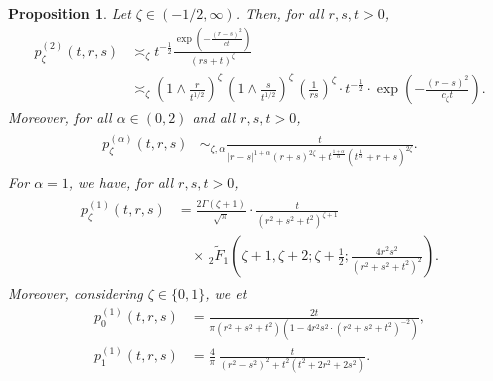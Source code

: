 \documentclass[12pt,reqno]{amsart}
\newtheorem{proposition}[theorem]{Proposition}
\theoremstyle{definition}
\theoremstyle{remark}
\numberwithin{equation}{section}
\newcommand{\1}{\mathbbm{1}}
\begin{document}
\begin{proposition}
  \label{heatkernelalpha1subordinatedboundsfinal}
  Let $\zeta\in(-1/2,\infty)$. Then, for all $r,s,t>0$,
  \begin{subequations}
    \label{eq:easybounds2}
    \begin{align}
      p_\zeta^{(2)}(t,r,s)
      \label{eq:easybounds2a}
      & \asymp_\zeta t^{-\frac12}\frac{\exp\left(-\frac{(r-s)^2}{ct}\right)}{(rs+t)^{\zeta}} \\
      \label{eq:easybounds2b}
      & \asymp_\zeta \left(1\wedge\frac{r}{t^{1/2}}\right)^{\zeta}\, \left(1\wedge\frac{s}{t^{1/2}}\right)^{\zeta}\,\left(\frac{1}{rs}\right)^{\zeta} \cdot t^{-\frac12} \cdot \exp\left(-\frac{(r-s)^2}{c_\zeta t}\right).
    \end{align}
  \end{subequations}
  Moreover, for all $\alpha\in(0,2)$ and all $r,s,t>0$,
  \begin{align}
    \label{eq:heatkernelalpha1weightedsubordinatedboundsfinal}
    \begin{split}
      p_\zeta^{(\alpha)}(t,r,s)
      & \sim_{\zeta,\alpha} \frac{t}{|r-s|^{1+\alpha}(r+s)^{2\zeta} + t^{\frac{1+\alpha}{\alpha}}(t^{\frac1\alpha}+r+s)^{2\zeta}}.
    \end{split}
  \end{align}
  For $\alpha=1$, we have, for all $r,s,t>0$,
  \begin{align}
    \label{eq:heatkernell}
    \begin{split}
      p_\zeta^{(1)}(t,r,s)
      & = \frac{2\Gamma(\zeta+1)}{\sqrt\pi} \cdot \frac{t}{\left(r^2+s^2+t^2\right)^{\zeta+1}} \\
        & \quad \times\, _2\tilde{F}_1\left(\zeta+1,\zeta+2;\zeta+\frac{1}{2};\frac{4r^2s^2}{\left(r^2+s^2+t^2\right)^2}\right).
    \end{split}
  \end{align}
  Moreover, considering $\zeta\in\{0,1\}$, we et
  \begin{subequations}
    \label{eq:heatkernell0}
    \begin{align}
      p_0^{(1)}(t,r,s) & = \frac{2 t}{\pi  \left(r^2+s^2+t^2\right) \left(1- 4 r^2 s^2 \cdot \left(r^2+s^2+t^2\right)^{-2}\right)}, \\
      p_1^{(1)}(t,r,s) & = \frac{4}{\pi}\, \frac{t}{(r^2-s^2)^2+t^2(t^2+2r^2+2s^2)}.
    \end{align}
  \end{subequations}
\end{proposition}
\end{document}
